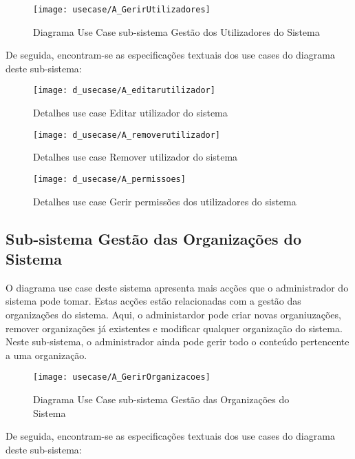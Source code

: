 \documentclass[12pt,a4paper]{article}
\begin{document}
\begin{figure}[h!]
\centering
\texttt{[image: usecase/A\_GerirUtilizadores]}
\label{usecase}
\caption{Diagrama Use Case sub-sistema Gestão dos Utilizadores do Sistema}
\end{figure}

De seguida, encontram-se as especificações textuais dos use cases do diagrama deste sub-sistema:\\

\begin{figure}[h!]
\centering
\texttt{[image: d\_usecase/A\_editarutilizador]}
\label{usecase}
\caption{Detalhes use case Editar utilizador do sistema}
\end{figure}

\begin{figure}[h!]
\centering
\texttt{[image: d\_usecase/A\_removerutilizador]}
\label{usecase}
\caption{Detalhes use case Remover utilizador do sistema}
\end{figure}

\begin{figure}[h!]
\centering
\texttt{[image: d\_usecase/A\_permissoes]}
\label{usecase}
\caption{Detalhes use case Gerir permissões dos utilizadores do sistema} 
\end{figure}

\clearpage

\subsection{Sub-sistema Gestão das Organizações do Sistema}
O diagrama use case deste sistema apresenta mais acções que o administrador do sistema
pode tomar. Estas acções estão relacionadas com a gestão das organizações do sistema. Aqui, o
administardor pode criar novas organiuzações, remover organizações já existentes e modificar qualquer organização do sistema. Neste sub-sistema, o administrador ainda pode gerir todo o conteúdo pertencente a uma organização.\\

\begin{figure}[h!]
\centering
\texttt{[image: usecase/A\_GerirOrganizacoes]}
\label{usecase}
\caption{Diagrama Use Case sub-sistema Gestão das Organizações do Sistema}
\end{figure}

De seguida, encontram-se as especificações textuais dos use cases do diagrama deste sub-sistema:\\
\end{document}
